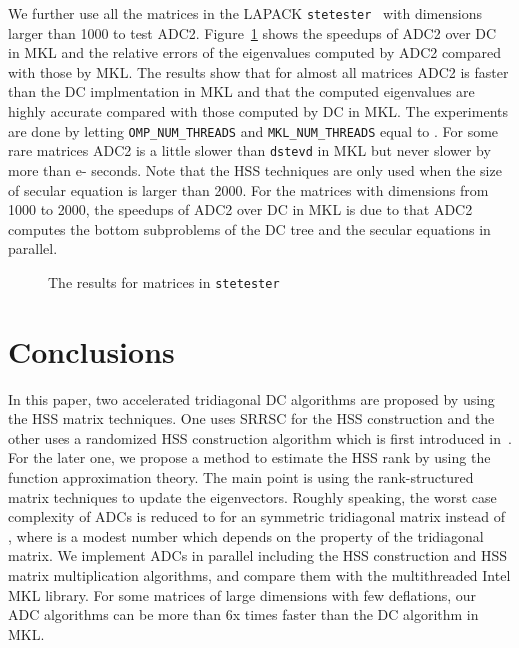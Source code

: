 \documentclass[times]{nlaauth}
\newcounter{algorithm}
\begin{document}
We further use all the matrices in the LAPACK \texttt{stetester}~\cite{A880} with dimensions larger than
1000 to test ADC2.
Figure~\ref{fig:lapack-tester} shows the speedups of ADC2 over DC in MKL and the relative errors
of the eigenvalues computed by ADC2 compared with those by MKL.
The results show that for almost all matrices ADC2 is faster than the DC implmentation in MKL
and that the computed eigenvalues are highly accurate compared with
those computed by DC in MKL.
The experiments are done by letting \texttt{OMP\_NUM\_THREADS} and \texttt{MKL\_NUM\_THREADS}
equal to .
For some rare matrices ADC2 is a little slower than \texttt{dstevd} in MKL but never slower by
more than e- seconds.
Note that the HSS techniques are only used when the size of secular equation
is larger than 2000.
For the matrices with dimensions from 1000 to 2000, the speedups of ADC2
over DC in MKL is due to that ADC2 computes the bottom subproblems of the
DC tree and the secular equations in parallel.


\begin{figure}[ptbh]
\centering
{}
\caption{The results for matrices in \texttt{stetester}}
\label{fig:lapack-tester}
\end{figure}

\section{Conclusions}

In this paper, two accelerated tridiagonal DC algorithms are proposed by
using the HSS matrix techniques. One uses SRRSC for the HSS construction and the other
uses a randomized HSS construction algorithm which is first introduced in~\cite{rand-hss}.
For the later one, we propose a method to estimate the HSS rank
by using the function approximation theory.
The main point is using the rank-structured matrix techniques to update the eigenvectors.
Roughly speaking,  the worst case complexity of ADCs is reduced to  for an 
symmetric tridiagonal matrix instead of , where  is a modest number which depends on
the property of the tridiagonal matrix.
We implement ADCs in parallel including the HSS construction and HSS matrix multiplication algorithms, and
compare them with the multithreaded Intel MKL library.
For some matrices of large dimensions with few deflations, our ADC algorithms can be more than 6x times faster than the DC algorithm in MKL.
\end{document}
